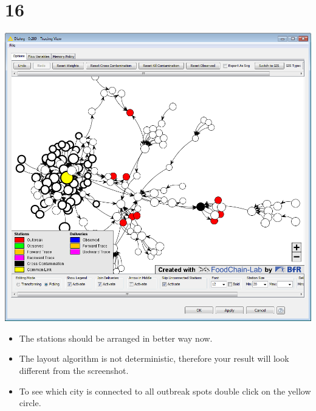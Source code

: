 \documentclass{beamer}
\begin{document}
\section{16}
\begin{frame}
	\begin{center}
  		\includegraphics[height=0.6\textheight]{16.png}
	\end{center}
	\begin{itemize}
		\item The stations should be arranged in better way now.
		\item The layout algorithm is not deterministic, therefore your result will look different from the screenshot.
		\item To see which city is connected to all outbreak spots double click on the yellow circle.		
	\end{itemize}
\end{frame}
\end{document}
